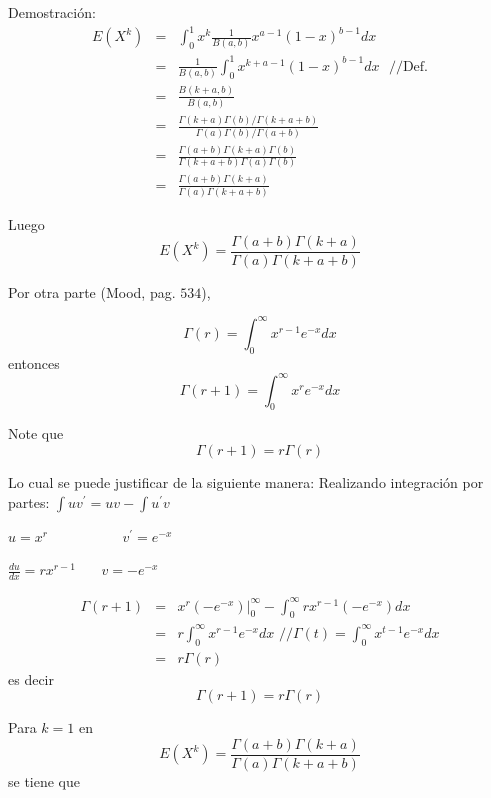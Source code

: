 \begin{i}
Demostración:
\begin{eqnarray*}
E(X^{k}) &=&\int_{0}^{1}x^{k}\frac{1}{B(a,b)}x^{a-1}(1-x)^{b-1}dx \\
&=&\frac{1}{B(a,b)}\int_{0}^{1}x^{k+a-1}(1-x)^{b-1}dx\text{ \ }//\text{Def.}
\\
&=&\frac{B(k+a,b)}{B(a,b)} \\
&=&\frac{\Gamma (k+a)\Gamma (b)/\Gamma (k+a+b)}{\Gamma (a)\Gamma (b)/\Gamma
(a+b)} \\
&=&\frac{\Gamma (a+b)\Gamma (k+a)\Gamma (b)}{\Gamma (k+a+b)\Gamma (a)\Gamma
(b)} \\
&=&\frac{\Gamma (a+b)\Gamma (k+a)}{\Gamma (a)\Gamma (k+a+b)}
\end{eqnarray*}

Luego 
\begin{equation*}
E(X^{k})=\frac{\Gamma (a+b)\Gamma (k+a)}{\Gamma (a)\Gamma (k+a+b)}
\end{equation*}


Por otra parte (Mood, pag. $534$),

\begin{equation*}
\Gamma (r)=\int_{0}^{\infty }x^{r-1}e^{-x}dx
\end{equation*}%
entonces 
\begin{equation*}
\Gamma (r+1)=\int_{0}^{\infty }x^{r}e^{-x}dx
\end{equation*}

Note que 
\begin{equation*}
\Gamma (r+1)=r\Gamma (r)
\end{equation*}

Lo cual se puede justificar de la siguiente manera: Realizando integración por partes: $\int uv^{\prime }=uv-\int u^{\prime }v$

$u=x^{r}$ \ \ \ \ \ \ \ \ \ \ $v^{\prime }=e^{-x}$

$\frac{du}{dx}=rx^{r-1}$ \ \ \ $v=-e^{-x}$

\begin{eqnarray*}
\Gamma (r+1) &=&\left. x^{r}(-e^{-x})\right\vert _{0}^{\infty
}-\int_{0}^{\infty }rx^{r-1}(-e^{-x})dx \\
&=&r\int_{0}^{\infty }x^{r-1}e^{-x}dx\text{ \ //}\Gamma (t)=\int_{0}^{\infty
}x^{t-1}e^{-x}dx \\
&=&r\Gamma (r)
\end{eqnarray*}
es decir 
\begin{equation*}
\Gamma (r+1)=r\Gamma (r)
\end{equation*}


Para $k=1$ en 
\begin{equation*}
E(X^{k})=\frac{\Gamma (a+b)\Gamma (k+a)}{\Gamma (a)\Gamma (k+a+b)}
\end{equation*}%
se tiene que


\end{i}
